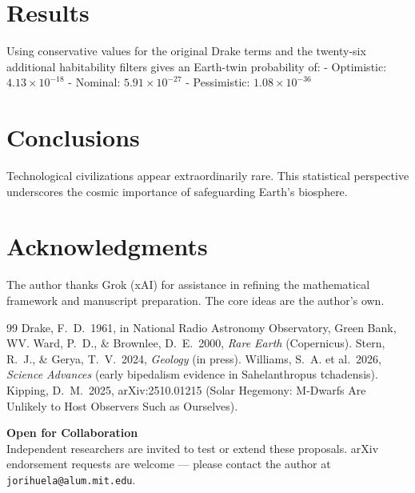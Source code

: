 \documentclass[12pt]{article}
\begin{document}
\section{Results}
Using conservative values for the original Drake terms and the twenty-six additional habitability filters gives an Earth-twin probability of:
- Optimistic: $4.13 \times 10^{-18}$
- Nominal: $5.91 \times 10^{-27}$
- Pessimistic: $1.08 \times 10^{-36}$

\section{Conclusions}
Technological civilizations appear extraordinarily rare. This statistical perspective underscores the cosmic importance of safeguarding Earth's biosphere.

\section*{Acknowledgments}
The author thanks Grok (xAI) for assistance in refining the mathematical framework and manuscript preparation. The core ideas are the author’s own.

\begin{thebibliography}{99}
 Drake, F.~D.\ 1961, in National Radio Astronomy Observatory, Green Bank, WV.
 Ward, P.~D., \& Brownlee, D.~E.\ 2000, {\it Rare Earth} (Copernicus).
 Stern, R.~J., \& Gerya, T.~V.\ 2024, {\it Geology} (in press).
 Williams, S.~A. et al.\ 2026, {\it Science Advances} (early bipedalism evidence in Sahelanthropus tchadensis).
 Kipping, D.~M.\ 2025, arXiv:2510.01215 (Solar Hegemony: M-Dwarfs Are Unlikely to Host Observers Such as Ourselves).
\end{thebibliography}

\vspace{2em}
\footnotesize
\noindent \textbf{Open for Collaboration} \\
Independent researchers are invited to test or extend these proposals. arXiv endorsement requests are welcome — please contact the author at \texttt{jorihuela@alum.mit.edu}.
\end{document}
